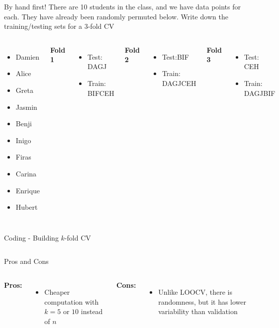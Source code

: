 \documentclass[aspectratio=169,usenames,dvipsnames]{beamer}
\newcommand{\InstructorList}[1]{
\begin{itemize}
	\color{orange}
	#1
\end{itemize}
}
\begin{document}
{
\begin{frame}[t]{By hand first!}
There are 10 students in the class, and we have data points for each. They have already been randomly permuted below. 
Write down the training/testing sets for a $3$-fold CV
\begin{columns}
\centering

\begin{itemize}
	\item Damien 
	\item Alice
	\item Greta 
	\item Jasmin
	\item Benji 
	\item Inigo
	\item Firas 
	\item Carina 
	\item Enrique 
	\item Hubert 
\end{itemize}

\centering
\textbf{Fold 1}

\InstructorList{
  \item Test: DAGJ
  \item Train: BIFCEH
}

\vspace{2in}
\centering
\textbf{Fold 2}
\InstructorList{
  \item Test:BIF 
  \item Train: DAGJCEH
}
\vspace{2in}
\centering
\textbf{Fold 3}
\InstructorList{
  \item Test: CEH
  \item Train: DAGJBIF
}
\vspace{2in}
\end{columns}
\end{frame}
}
{
\begin{frame}[t]{Coding - Building $k$-fold CV}
\begin{columns}
\centering
{}
\centering
\end{columns}
\end{frame}
}
\begin{frame}[t]{Pros and Cons}

\begin{columns}
\centering
\textbf{Pros:}
\InstructorList{
\item Cheaper computation with $k = 5$ or $10$ instead of $n$
}
\centering
\textbf{Cons:}
\InstructorList{
\item Unlike LOOCV, there is randomness, but it has lower variability  than validation

}

\end{columns}

\end{frame}
\end{document}
